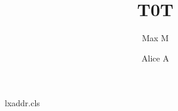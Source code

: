 \begin{filecontents*}[overwrite]{lxaddr.cls}
\def\address#1{\gdef\@address{#1}}
\def\email#1{\gdef\@email{#1}}
\let\@address\@empty
\renewcommand\maketitle{\par{\centering\@title\par\@author\par\@address\par\@email\par}}
\end{filecontents*}
\documentclass{lxaddr}
\address{Shared Inst}

\title{T0}\author{Max M}\maketitle
Text.
\title{T}\author{Alice A}\maketitle
Body.

